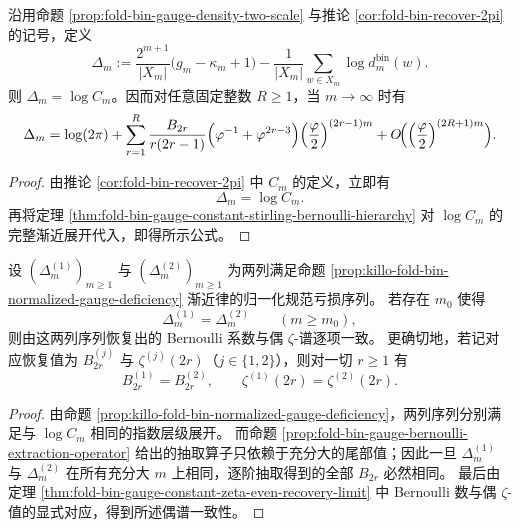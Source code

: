 \begin{proposition}\label{prop:killo-fold-bin-normalized-gauge-deficiency}
沿用命题 \ref{prop:fold-bin-gauge-density-two-scale} 与推论 \ref{cor:fold-bin-recover-2pi} 的记号，定义
\[
\Delta_m:=
\frac{2^{m+1}}{|X_m|}\bigl(g_m-\kappa_m+1\bigr)
-\frac{1}{|X_m|}\sum_{w\in X_m}\log d^{\mathrm{bin}}_m(w).
\]
则 \(\Delta_m=\log C_m\)。因而对任意固定整数 \(R\ge 1\)，当 \(m\to\infty\) 时有
\[
\Delta_m
=
\log(2\pi)+
\sum_{r=1}^{R}
\frac{B_{2r}}{r(2r-1)}
\Bigl(\varphi^{-1}+\varphi^{2r-3}\Bigr)
\Bigl(\frac{\varphi}{2}\Bigr)^{(2r-1)m}
+O\!\Bigl(\Bigl(\frac{\varphi}{2}\Bigr)^{(2R+1)m}\Bigr).
\]
\end{proposition}
\begin{proof}
由推论 \ref{cor:fold-bin-recover-2pi} 中 \(C_m\) 的定义，立即有
\[
\Delta_m=\log C_m.
\]
再将定理 \ref{thm:fold-bin-gauge-constant-stirling-bernoulli-hierarchy} 对 \(\log C_m\) 的完整渐近展开代入，即得所示公式。
\end{proof}

\begin{corollary}\label{cor:killo-fold-bin-normalized-gauge-deficiency-tail-rigidity}
设 \((\Delta_m^{(1)})_{m\ge 1}\) 与 \((\Delta_m^{(2)})_{m\ge 1}\) 为两列满足命题 \ref{prop:killo-fold-bin-normalized-gauge-deficiency} 渐近律的归一化规范亏损序列。
若存在 \(m_0\) 使得
\[
\Delta_m^{(1)}=\Delta_m^{(2)}
\qquad (m\ge m_0),
\]
则由这两列序列恢复出的 Bernoulli 系数与偶 \(\zeta\)-谱逐项一致。
更确切地，若记对应恢复值为 \(B_{2r}^{(j)}\) 与 \(\zeta^{(j)}(2r)\)（\(j\in\{1,2\}\)），则对一切 \(r\ge 1\) 有
\[
B_{2r}^{(1)}=B_{2r}^{(2)},
\qquad
\zeta^{(1)}(2r)=\zeta^{(2)}(2r).
\]
\end{corollary}
\begin{proof}
由命题 \ref{prop:killo-fold-bin-normalized-gauge-deficiency}，两列序列分别满足与 \(\log C_m\) 相同的指数层级展开。
而命题 \ref{prop:fold-bin-gauge-bernoulli-extraction-operator} 给出的抽取算子只依赖于充分大的尾部值；因此一旦 \(\Delta_m^{(1)}\) 与 \(\Delta_m^{(2)}\) 在所有充分大 \(m\) 上相同，逐阶抽取得到的全部 \(B_{2r}\) 必然相同。
最后由定理 \ref{thm:fold-bin-gauge-constant-zeta-even-recovery-limit} 中 Bernoulli 数与偶 \(\zeta\)-值的显式对应，得到所述偶谱一致性。
\end{proof}

\endinput

